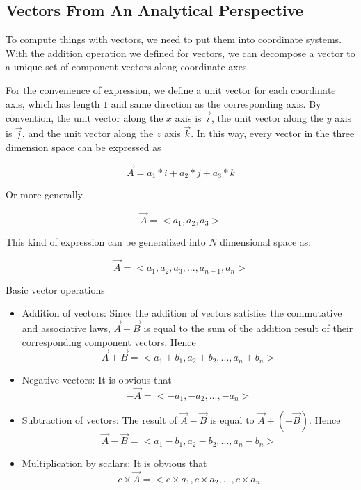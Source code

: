\documentclass{article}
\begin{document}
\bigskip

\subsection{Vectors From An Analytical Perspective}

To compute things with vectors, we need to put them into coordinate systems.
With the addition operation we defined for vectors, we can decompose a vector
to a unique set of component vectors along coordinate axes.

For the convenience of expression, we define a unit vector for each coordinate
axis, which has length $1$ and same direction as the corresponding axis. By
convention, the unit vector along the $x$ axis is $\vec{i}$, the unit vector
along the $y$ axis is $\vec{j}$, and the unit vector along the $z$ axis
$\vec{k}$. In this way, every vector in the three dimension space can be
expressed as

\[ \vec{A} = a_{1} * i + a_{2} * j + a_{3} * k \]

Or more generally

\[ \vec{A} = <a_{1}, a_{2}, a_{3}> \]

This kind of expression can be generalized into $N$ dimensional space as:

\[ \vec{A} = <a_{1}, a_{2}, a_{3}, ..., a_{n-1}, a_{n}> \]

\bigskip

Basic vector operations
\begin{itemize}
    \item Addition of vectors: Since the addition of vectors satisfies the
    commutative and associative laws, $\vec{A} + \vec{B}$ is equal to the sum
    of the addition result of their corresponding component vectors. Hence
    \[ \vec{A} + \vec{B} = <a_{1} + b_{1}, a_{2} + b_{2}, ..., a_{n} + b_{n}> \]

    \item Negative vectors: It is obvious that
    \[ -\vec{A} = <-a_{1}, -a_{2}, ..., -a_{n}> \]

    \item Subtraction of vectors: The result of $\vec{A} - \vec{B}$ is equal to
    $\vec{A} + (-\vec{B})$. Hence
    \[ \vec{A} - \vec{B} = <a_{1} - b_{1}, a_{2} - b_{2}, ..., a_{n} - b_{n}> \]

    \item Multiplication by scalars: It is obvious that
    \[ c \times \vec{A} = <c \times a_{1}, c \times a_{2}, ..., c \times a_{n} \]
\end{itemize}
\end{document}
